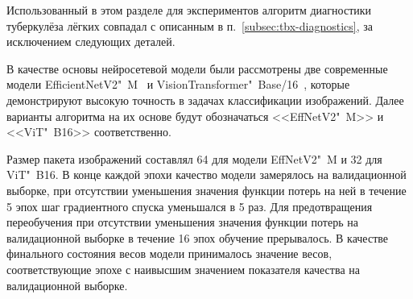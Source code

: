 Использованный в этом разделе для экспериментов алгоритм диагностики туберкулёза лёгких совпадал с описанным в п.~\ref{subsec:tbx-diagnostics}, за исключением следующих деталей.

В качестве основы нейросетевой модели были рассмотрены две современные модели EfficientNetV2"~M~\cite{tan2021efficientnetv2} и VisionTransformer"~Base/16~\cite{dosovitskiy2021an}, которые демонстрируют высокую точность в задачах классификации изображений. Далее варианты алгоритма на их основе будут обозначаться <<EffNetV2"~M>> и <<ViT"~B16>> соответственно. 

Размер пакета изображений составлял 64 для модели EffNetV2"~M и 32 для ViT"~B16. В конце каждой эпохи качество модели замерялось на валидационной выборке, при отсутствии уменьшения значения функции потерь на ней в течение 5 эпох шаг градиентного спуска уменьшался в 5 раз. Для предотвращения переобучения при отсутствии уменьшения значения функции потерь на валидационной выборке в течение 16 эпох обучение прерывалось. В качестве финального состояния весов модели принималось значение весов, соответствующие эпохе с наивысшим значением показателя качества на валидационной выборке. %

%
%
%

